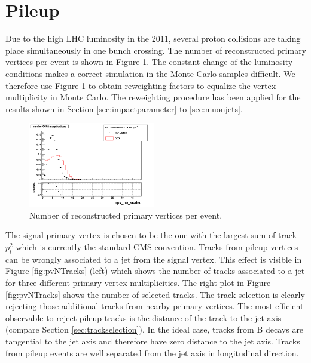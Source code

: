 \clearpage
\section{Pileup \label{sec:pileup}}
Due to the high LHC luminosity in the 2011, several proton collisions are taking place simultaneously in one bunch crossing. The number of reconstructed primary vertices per event is shown in Figure \ref{fig:Npv}. The constant change of the luminosity conditions makes a correct simulation in the Monte Carlo samples difficult. We therefore use Figure \ref{fig:Npv} to obtain reweighting factors to equalize the vertex multiplicity in Monte Carlo. The reweighting procedure has been applied for the results shown in Section \ref{sec:impactparameter} to \ref{sec:muonjets}.

\begin{figure}[h!]
\centering
\includegraphics[width=0.49\textwidth]{figures/npv_no_scaled_Linear.png}
\caption{Number of reconstructed primary vertices per event.}
\label{fig:Npv}
\end{figure}

The signal primary vertex is chosen to be the one with the largest sum of track $p_t^2$ which is currently the standard CMS convention. Tracks from pileup vertices can be wrongly associated to a jet from the signal vertex. This effect is visible in Figure \ref{fig:pvNTracks} (left) which shows the number of tracks associated to a jet for three different primary vertex multiplicities. The right plot in Figure \ref{fig:pvNTracks} shows the number of selected tracks. The track selection is clearly rejecting those additional tracks from nearby primary vertices. The most efficient observable to  reject pileup tracks is the distance of the track to the jet axis (compare Section \ref{sec:trackselection}). In the ideal case, tracks from B decays are tangential to the jet axis and therefore have zero distance to the jet axis. Tracks  from pileup events are well separated from the jet axis in longitudinal direction.

